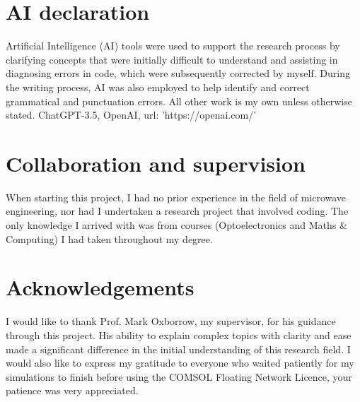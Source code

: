\section*{AI declaration}    %
Artificial Intelligence (AI) tools were used to support the research process by
clarifying concepts that were initially difficult to understand and assisting in
diagnosing errors in code, which were subsequently corrected by myself. During
the writing process, AI was also employed to help identify and correct
grammatical and punctuation errors. All other work is my own unless otherwise
stated. ChatGPT-3.5, OpenAI, url: {'https://openai.com/'}

\section*{Collaboration and supervision}
When starting this project, I had no prior experience in the field of microwave
engineering, nor had I undertaken a research project that involved coding. The
only knowledge I arrived with was from courses (Optoelectronics and Maths \&
Computing) I had taken throughout my degree.

\section*{Acknowledgements}
I would like to thank Prof. Mark Oxborrow, my supervisor, for his guidance
through this project. His ability to explain complex topics with clarity and
ease made a significant difference in the initial understanding of this research
field. I would also like to express my gratitude to everyone who waited
patiently for my simulations to finish before using the
COMSOL\textregistered{}{} Floating Network Licence, your patience was very
appreciated.
